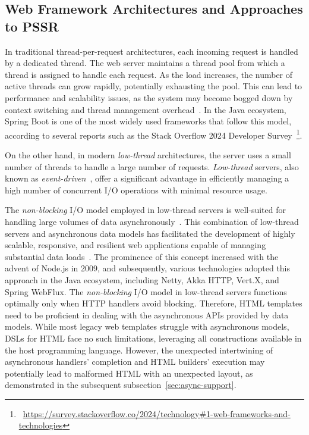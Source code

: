 \subsection{Web Framework Architectures and Approaches to PSSR}

In traditional thread-per-request architectures, each incoming request is
handled by a dedicated thread. The web server maintains a thread pool from
which a thread is assigned to handle each request. As the load increases, the
number of active threads can grow rapidly, potentially exhausting the pool.
This can lead to performance and scalability issues, as the system may become
bogged down by context switching and thread management
overhead~\cite{kant2000scalable}. In the Java ecosystem, Spring Boot is one of
the most widely used frameworks that follow this model, according to several
reports such as the Stack Overflow 2024 Developer
Survey~\footnote{~\url{https://survey.stackoverflow.co/2024/technology\#1-web-frameworks-and-technologies}}.

On the other hand, in modern \textit{low-thread} architectures, the server uses
a small number of threads to handle a large number of requests.
\textit{Low-thread} servers, also known as
\textit{event-driven}~\cite{event-driven-servers}, offer a significant
advantage in efficiently managing a high number of concurrent I/O operations
with minimal resource usage.

The \textit{non-blocking} I/O model employed in low-thread servers is
well-suited for handling large volumes of data asynchronously~\cite{Meijer12}.
This combination of low-thread servers and asynchronous data models has
facilitated the development of highly scalable, responsive, and resilient web
applications capable of managing substantial data loads~\cite{Jin15}. The
prominence of this concept increased with the advent of Node.js in 2009, and
subsequently, various technologies adopted this approach in the Java ecosystem,
including Netty, Akka HTTP, Vert.X, and Spring WebFlux.
The \textit{non-blocking} I/O model in low-thread servers functions optimally
only when HTTP handlers avoid blocking. Therefore, HTML templates need to be
proficient in dealing with the asynchronous APIs provided by data models. While
most legacy web templates struggle with asynchronous models, DSLs for HTML face
no such limitations, leveraging all constructions available in the host
programming language. However, the unexpected intertwining of asynchronous
handlers' completion and HTML builders' execution may potentially lead to
malformed HTML with an unexpected layout, as demonstrated in the subsequent
subsection~\ref{sec:async-support}.

